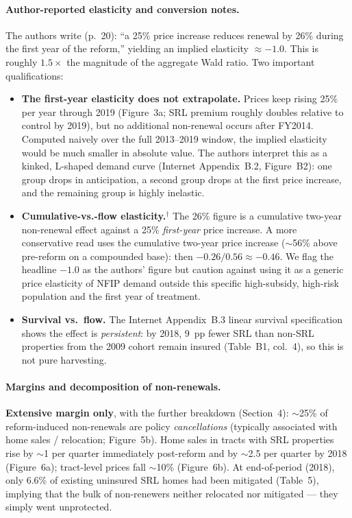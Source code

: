 \documentclass[11pt]{article}
\begin{document}
\paragraph{Author-reported elasticity and conversion notes.}
The authors write (p.~20): ``a 25\% price increase reduces renewal by 26\%
during the first year of the reform,'' yielding an implied elasticity
$\approx -1.0$. This is roughly $1.5\times$ the magnitude of the
\citet{hennighausen2023} aggregate Wald ratio. Two important qualifications:
\begin{itemize}
\item \textbf{The first-year elasticity does not extrapolate.} Prices keep
rising 25\% per year through 2019 (Figure~3a; SRL premium roughly doubles
relative to control by 2019), but no additional non-renewal occurs after
FY2014. Computed naively over the full 2013--2019 window, the implied
elasticity would be much smaller in absolute value. The authors interpret
this as a kinked, L-shaped demand curve (Internet Appendix~B.2,
Figure~B2): one group drops in anticipation, a second group drops at the
first price increase, and the remaining group is highly inelastic.
\item \textbf{Cumulative-vs.-flow elasticity.}$^\dagger$ The 26\% figure is
a cumulative two-year non-renewal effect against a 25\% \emph{first-year}
price increase. A more conservative read uses the cumulative two-year
price increase ($\sim$56\% above pre-reform on a compounded base): then
$-0.26/0.56 \approx -0.46$. We flag the headline $-1.0$ as the
authors' figure but caution against using it as a generic price elasticity
of NFIP demand outside this specific high-subsidy, high-risk population
and the first year of treatment.
\item \textbf{Survival vs.\ flow.} The Internet Appendix~B.3 linear survival
specification shows the effect is \emph{persistent}: by 2018, 9~pp fewer SRL
than non-SRL properties from the 2009 cohort remain insured (Table~B1,
col.~4), so this is not pure harvesting.
\end{itemize}

\paragraph{Margins and decomposition of non-renewals.}
\textbf{Extensive margin only}, with the further breakdown (Section~4):
$\sim$25\% of reform-induced non-renewals are policy \emph{cancellations}
(typically associated with home sales / relocation; Figure~5b). Home sales
in tracts with SRL properties rise by $\sim$1 per quarter immediately
post-reform and by $\sim$2.5 per quarter by 2018 (Figure~6a); tract-level
prices fall $\sim$10\% (Figure~6b). At end-of-period (2018), only 6.6\% of
existing uninsured SRL homes had been mitigated (Table~5), implying that
the bulk of non-renewers neither relocated nor mitigated --- they simply
went unprotected.
\end{document}
